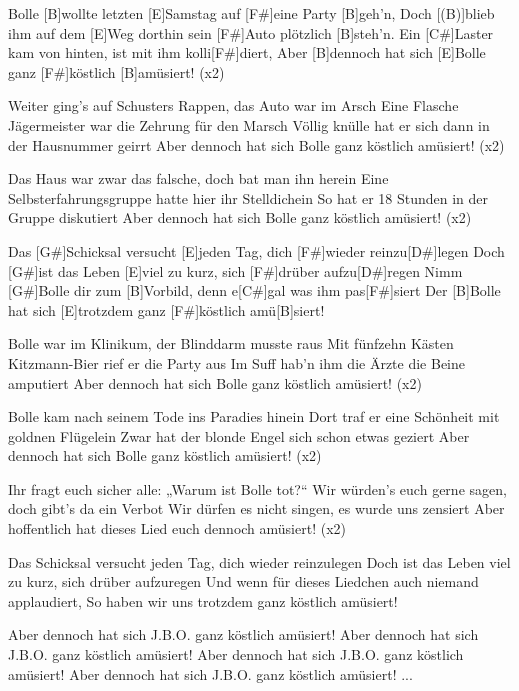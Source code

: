 

\begin{guitar}
	Bolle [B]wollte letzten [E]Samstag auf [F#]eine Party [B]geh’n,
	Doch [(B)]blieb ihm auf dem [E]Weg dorthin sein [F#]Auto plötzlich [B]steh’n.
	Ein [C#]Laster kam von hinten, ist mit ihm kolli[F#]diert,
	Aber [B]dennoch hat sich [E]Bolle ganz [F#]köstlich [B]amüsiert! (x2)
	
	Weiter ging’s auf Schusters Rappen, das Auto war im Arsch
	Eine Flasche Jägermeister war die Zehrung für den Marsch
	Völlig knülle hat er sich dann in der Hausnummer geirrt
	Aber dennoch hat sich Bolle ganz köstlich amüsiert! (x2)
	
	Das Haus war zwar das falsche, doch bat man ihn herein
	Eine Selbsterfahrungsgruppe hatte hier ihr Stelldichein
	So hat er 18 Stunden in der Gruppe diskutiert
	Aber dennoch hat sich Bolle ganz köstlich amüsiert! (x2)
	
	Das [G#]Schicksal versucht [E]jeden Tag, dich [F#]wieder reinzu[D#]legen
	Doch [G#]ist das Leben [E]viel zu kurz, sich [F#]drüber aufzu[D#]regen
	Nimm [G#]Bolle dir zum [B]Vorbild, denn e[C#]gal was ihm pas[F#]siert
	Der [B]Bolle hat sich [E]trotzdem ganz [F#]köstlich amü[B]siert! 
	
	Bolle war im Klinikum, der Blinddarm musste raus
	Mit fünfzehn Kästen Kitzmann-Bier rief er die Party aus
	Im Suff hab'n ihm die Ärzte die Beine amputiert
	Aber dennoch hat sich Bolle ganz köstlich amüsiert! (x2)
	
	Bolle kam nach seinem Tode ins Paradies hinein
	Dort traf er eine Schönheit mit goldnen Flügelein
	Zwar hat der blonde Engel sich schon etwas geziert
	Aber dennoch hat sich Bolle ganz köstlich amüsiert! (x2)
	
	 
	
	Ihr fragt euch sicher alle: „Warum ist Bolle tot?“
	Wir würden's euch gerne sagen, doch gibt’s da ein Verbot
	Wir dürfen es nicht singen, es wurde uns zensiert
	Aber hoffentlich hat dieses Lied euch dennoch amüsiert! (x2)
	
	Das Schicksal versucht jeden Tag, dich wieder reinzulegen
	Doch ist das Leben viel zu kurz, sich drüber aufzuregen
	Und wenn für dieses Liedchen auch niemand applaudiert,
	So haben wir uns trotzdem ganz köstlich amüsiert!

	Aber dennoch hat sich J.B.O. ganz köstlich amüsiert!
	Aber dennoch hat sich J.B.O. ganz köstlich amüsiert!
	Aber dennoch hat sich J.B.O. ganz köstlich amüsiert!
	Aber dennoch hat sich J.B.O. ganz köstlich amüsiert!
	...	
	
\end{guitar}